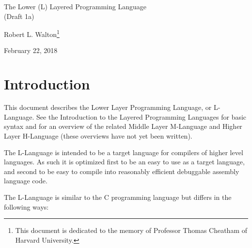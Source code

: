\documentclass[12pt]{article}
\makeatletter
\renewcommand\tableofcontents{%
    \begin{list}{}%
	     {\setlength{\itemsep}{0in}%
	      \setlength{\topsep}{0in}%
	      \setlength{\parsep}{1ex}%
	      \setlength{\labelwidth}{0in}%
	      \setlength{\baselineskip}{1.5ex}%
	      \setlength{\leftmargin}{1.0in}%
	      \setlength{\rightmargin}{1.0in}}%
    \item\@starttoc{toc}%
    \end{list}}
\makeatother
\begin{document}
        
\begin{center}

{\Large
The Lower (L) Layered Programming Language \\[0.5ex]
(Draft 1a)}

\medskip

Robert L. Walton\footnote{This document is dedicated to the memory
of Professor Thomas Cheatham of Harvard University.}

February 22, 2018
 
\end{center}

{\small \tableofcontents}

\newpage

\section{Introduction}

This document describes the Lower Layer Programming Language, or
L-Language.  See the Introduction to the Layered
Programming Languages for basic syntax and for an overview of the related
Middle Layer M-Language and Higher Layer H-Language (these overviews
have not yet been written).

The L-Language is intended to be a target language for compilers of
higher level languages.  As such it is optimized first to be an easy to 
use as a target language, and second to be easy to
compile into reasonably efficient debuggable assembly language code.

The L-Language is similar to the C programming language
but differs in the following ways:
\end{document}
